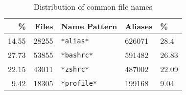 \begin{table}
	\caption{Distribution of common file names}
    \label{tab:file-names}
    \begin{tabular}{rrlll}
        \toprule
                  \% &         Files &           Name Pattern &        Aliases &           \% \\
        \midrule
         \num{14.55} &  \num{28255}  &         \verb|*alias*| &  \num{626071}  &   \num{28.4} \\
         \num{27.73} &  \num{53855}  &        \verb|*bashrc*| &  \num{591482}  &  \num{26.83} \\
         \num{22.15} &  \num{43011}  &         \verb|*zshrc*| &  \num{487002}  &  \num{22.09} \\
          \num{9.42} &  \num{18305}  &       \verb|*profile*| &  \num{199168}  &   \num{9.04} \\
        \bottomrule
        \end{tabular}
\end{table}